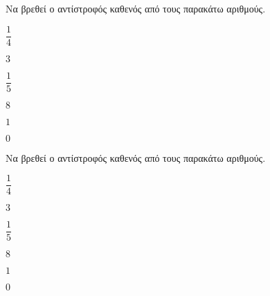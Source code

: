 Να βρεθεί ο αντίστροφός καθενός από τους παρακάτω αριθμούς.
\begin{multicols}{3}
\begin{alist}
\item $ \dfrac{1}{4} $
\item $ 3 $
\item $ \dfrac{1}{5} $
\item $ 8 $
\item $ 1 $
\item $ 0 $
\end{alist}
\end{multicols}
Να βρεθεί ο αντίστροφός καθενός από τους παρακάτω αριθμούς.
\begin{multicols}{3}
\begin{alist}
\item $ \dfrac{1}{4} $
\item $ 3 $
\item $ \dfrac{1}{5} $
\item $ 8 $
\item $ 1 $
\item $ 0 $
\end{alist}
\end{multicols}
